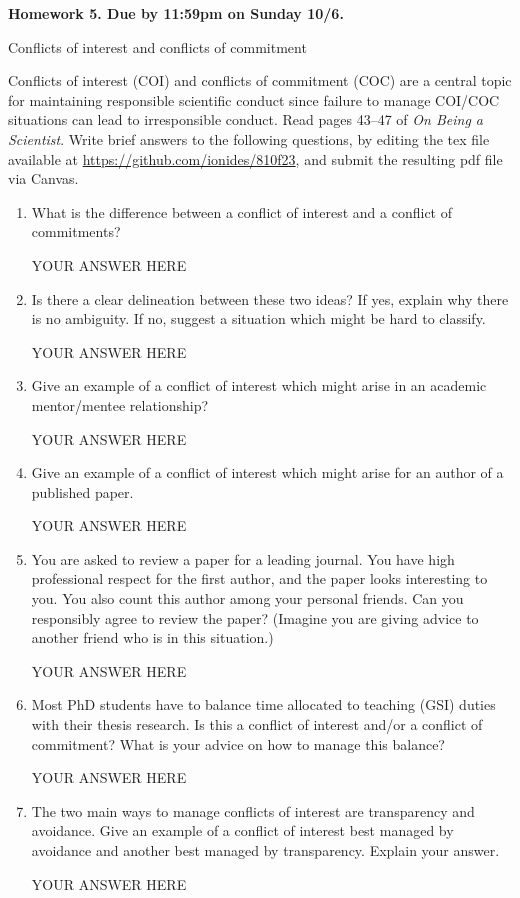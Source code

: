 \documentclass[12pt]{article}
\begin{document}
\begin{center}\bf
Homework 5. Due by 11:59pm on Sunday 10/6.

Conflicts of interest and conflicts of commitment

\end{center}
Conflicts of interest (COI) and conflicts of commitment (COC) are a central topic for maintaining responsible scientific conduct since failure to manage COI/COC situations can lead to irresponsible conduct. Read pages 43--47 of {\em On Being a Scientist}. Write brief answers to the following questions, by editing the tex file available at \url{https://github.com/ionides/810f23}, and submit the resulting pdf file via Canvas.

\begin{enumerate}

\item What is the difference between a conflict of interest and a conflict of commitments? 

YOUR ANSWER HERE

\item Is there a clear delineation between these two ideas? If yes, explain why there is no ambiguity. If no, suggest a situation which might be hard to classify.

YOUR ANSWER HERE

\item Give an example of a conflict of interest which might arise in an academic mentor/mentee relationship?

YOUR ANSWER HERE

\item Give an example of a conflict of interest which might arise for an author of a published paper.

YOUR ANSWER HERE

\item You are asked to review a paper for a leading journal. You have high professional respect for the first author, and the paper looks interesting to you. You also count this author among your personal friends. Can you responsibly agree to review the paper? (Imagine you are giving advice to another friend who is in this situation.)

YOUR ANSWER HERE

\item Most PhD students have to balance time allocated to teaching (GSI) duties with their thesis research. Is this a conflict of interest and/or a conflict of commitment? What is your advice on how to manage this balance?

YOUR ANSWER HERE

\item The two main ways to manage conflicts of interest are transparency and avoidance. Give an example of a conflict of interest best managed by avoidance and another best managed by transparency. Explain your answer.

YOUR ANSWER HERE

\end{enumerate}
\end{document}
